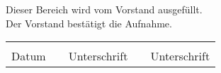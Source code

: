 \documentclass[parskip=half]{scrreprt}
\begin{document}
\vspace{3cm}
\setlength{\fboxsep}{0.5em}
\colorbox{gray!20}{
\begin{minipage}{\textwidth - 2\fboxsep}
{\tiny Dieser Bereich wird vom Vorstand ausgefüllt.}\\[1em]
Der Vorstand bestätigt die Aufnahme.\\[1cm]

\begin{tabularx}{\textwidth}{@{}p{4cm} c p{5cm} c p{5cm}}
\dotfill & & \dotfill & & \dotfill\\
Datum & & Unterschrift & & Unterschrift%
\end{tabularx}
\end{minipage}}
\end{document}
